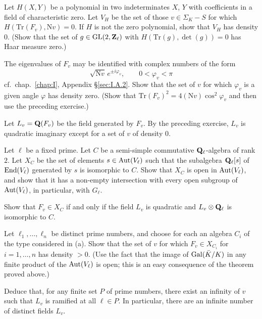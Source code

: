 \begin{nlist}
\item Let $H(X,Y)$ be a polynomial in two indeterminates $X$, $Y$ with
coefficients in a field of characteristic zero.  Let $V_H$ be the set of
those $v \in \Sigma_K - S$ for which
$H(\mathrm{Tr}(F_v), \mathrm{N}v) = 0$.  If $H$ is not the zero
polynomial, show that $V_H$ has density $0$.  (Show that the set of
$g \in \mathrm{GL}(2,\mathbf{Z}_\ell)$ with
$H(\mathrm{Tr}(g), \det(g)) = 0$ has Haar measure zero.)

\item The eigenvalues of $F_v$ may be identified with complex numbers of
the form
\[
\sqrt{\mathrm{N}v}\, e^{\pm i\varphi_v}, \qquad 0 < \varphi_v < \pi
\]
cf.~chap.~\ref{chap:I}, Appendix \S\ref{sec:I.A.2}.  Show that the set of
$v$ for which $\varphi_v$ is a given angle $\varphi$ has density zero.
(Show that $\mathrm{Tr}(F_v)^2 = 4(\mathrm{N}v)\cos^2 \varphi_v$ and then
use the preceding exercise.)

\item Let $L_v = \mathbf{Q}(F_v)$ be the field generated by $F_v$.  By the
preceding exercise, $L_v$ is quadratic imaginary except for a set of $v$
of density $0$.
\begin{alist}
\item Let $\ell$ be a fixed prime.  Let $C$ be a semi-simple commutative
$\mathbf{Q}_\ell$-algebra of rank $2$.  Let $X_C$ be the set of elements
$s \in \mathrm{Aut}(V_\ell)$ such that the subalgebra $\mathbf{Q}_\ell[s]$ of
$\mathrm{End}(V_\ell)$ generated by $s$ is isomorphic to $C$.  Show that $X_C$ is
open in $\mathrm{Aut}(V_\ell)$, and show that it has a non-empty intersection
with every open subgroup of $\mathrm{Aut}(V_\ell)$, in particular, with $G_\ell$.

\item Show that $F_v \in X_C$ if and only if the field $L_v$ is quadratic
and $L_v \mathbin{\otimes} \mathbf{Q}_\ell$ is isomorphic to $C$.

\item Let $\ell_1, \ldots, \ell_n$ be distinct prime numbers, and choose
for each an algebra $C_i$ of the type considered in (a).  Show that the
set of $v$ for which $F_v \in X_{C_i}$ for $i = 1, \ldots, n$ has density
$> 0$.  (Use the fact that the image of $\mathrm{Gal}(\bar{K}/K)$ in any finite
product of the $\mathrm{Aut}(V_\ell)$ is open; this is an easy consequence of the
theorem proved above.)

\item Deduce that, for any finite set $P$ of prime numbers, there exist an
infinity of $v$ such that $L_v$ is ramified at all $\ell \in P$.  In
particular, there are an infinite number of distinct fields $L_v$.
\end{alist}
\end{nlist}

